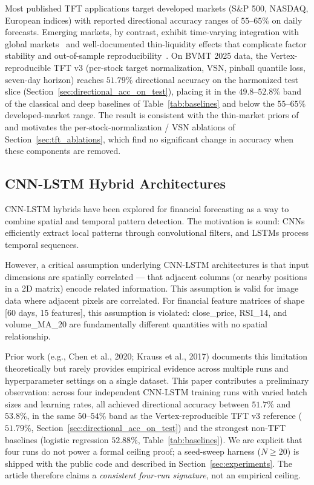 \documentclass[conference]{IEEEtran}
\begin{document}
Most published TFT applications target developed markets (S\&P 500, NASDAQ, European indices) with reported directional accuracy ranges of $55$--$65\%$ on daily forecasts. Emerging markets, by contrast, exhibit time-varying integration with global markets~\cite{ref:bekaert_harvey} and well-documented thin-liquidity effects that complicate factor stability and out-of-sample reproducibility~\cite{ref:harvey_multiple,ref:lopez_causal}. On BVMT 2025 data, the Vertex-reproducible TFT v3 (per-stock target normalization, VSN, pinball quantile loss, seven-day horizon) reaches $51.79\%$ directional accuracy on the harmonized test slice (Section~\ref{sec:directional_acc_on_test}), placing it in the $49.8$--$52.8\%$ band of the classical and deep baselines of Table~\ref{tab:baselines} and below the $55$--$65\%$ developed-market range. The result is consistent with the thin-market priors of \cite{ref:bekaert_harvey,ref:harvey_multiple} and motivates the per-stock-normalization / VSN ablations of Section~\ref{sec:tft_ablations}, which find no significant change in accuracy when these components are removed.

\subsection{CNN-LSTM Hybrid Architectures}

CNN-LSTM hybrids have been explored for financial forecasting as a way to combine spatial and temporal pattern detection. The motivation is sound: CNNs efficiently extract local patterns through convolutional filters, and LSTMs process temporal sequences.

However, a critical assumption underlying CNN-LSTM architectures is that input dimensions are spatially correlated — that adjacent columns (or nearby positions in a 2D matrix) encode related information. This assumption is valid for image data where adjacent pixels are correlated. For financial feature matrices of shape [60 days, 15 features], this assumption is violated: close\_price, RSI\_14, and volume\_MA\_20 are fundamentally different quantities with no spatial relationship.

Prior work (e.g., Chen et al., 2020; Krauss et al., 2017) documents this limitation theoretically but rarely provides empirical evidence across multiple runs and hyperparameter settings on a single dataset. This paper contributes a preliminary observation: across four independent CNN-LSTM training runs with varied batch sizes and learning rates, all achieved directional accuracy between $51.7\%$ and $53.8\%$, in the same $50$--$54\%$ band as the Vertex-reproducible TFT v3 reference ($51.79\%$, Section~\ref{sec:directional_acc_on_test}) and the strongest non-TFT baselines (logistic regression $52.88\%$, Table~\ref{tab:baselines}). We are explicit that four runs do not power a formal ceiling proof; a seed-sweep harness ($N \ge 20$) is shipped with the public code and described in Section~\ref{sec:experiments}. The article therefore claims a \emph{consistent four-run signature}, not an empirical ceiling.
\end{document}
